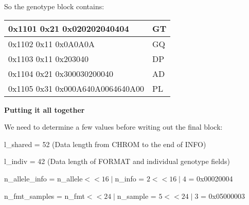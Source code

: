 \documentclass[8pt]{article}
\begin{document}
So the genotype block contains:

\vspace{0.3cm}
\begin{tabular}{|l| l|} \hline
0x1101 0x21 0x020202040404 & GT \\ \hline
0x1102 0x11 0x0A0A0A & GQ \\ \hline
0x1103 0x11 0x203040 & DP \\ \hline
0x1104 0x21 0x300030200040 & AD \\ \hline
0x1105 0x31 0x000A640A0064640A00 & PL \\ \hline
\end{tabular}
\vspace{0.3cm}

\textbf{Putting it all together}

We need to determine a few values before writing out the final block:

l\_shared = 52 (Data length from CHROM to the end of INFO)

l\_indiv = 42 (Data length of FORMAT and individual genotype fields)

n\_allele\_info = n\_allele$<<16\mid$n\_info = $2 << 16 \mid 4$ = 0x00020004

n\_fmt\_samples = n\_fmt$<<24\mid$n\_sample = $5 << 24 \mid 3$ = 0x05000003
\end{document}
